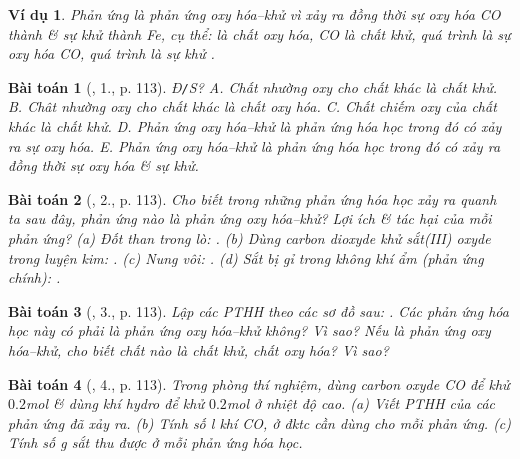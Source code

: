 \documentclass{article}
\newtheorem{baitoan}{Bài toán}
\newtheorem{vidu}{Ví dụ}
\begin{document}
\begin{vidu}
	Phản ứng \emph{} là \emph{phản ứng oxy hóa--khử} vì xảy ra đồng thời sự oxy hóa \emph{CO} thành \emph{} \& sự khử \emph{} thành \emph{Fe}, cụ thể: \emph{} là \emph{chất oxy hóa}, \emph{CO} là \emph{chất khử}, quá trình \emph{} là \emph{sự oxy hóa CO}, quá trình \emph{} là \emph{sự khử }.
\end{vidu}

\begin{baitoan}[\cite{SGK_Hoa_Hoc_8}, 1., p. 113]
	\emph{Đ\texttt{/}S?} {\sf A.} Chất nhường oxy cho chất khác là chất khử. {\sf B.} Chât nhường oxy cho chất khác là chất oxy hóa. {\sf C.} Chất chiếm oxy của chất khác là chất khử. {\sf D.} Phản ứng oxy hóa--khử là phản ứng hóa học trong đó có xảy ra sự oxy hóa. {\sf E.} Phản ứng oxy hóa--khử là phản ứng hóa học trong đó có xảy ra đồng thời sự oxy hóa \& sự khử.
\end{baitoan}

\begin{baitoan}[\cite{SGK_Hoa_Hoc_8}, 2., p. 113]
	Cho biết trong những phản ứng hóa học xảy ra quanh ta sau đây, phản ứng nào là phản ứng oxy hóa--khử? Lợi ích \& tác hại của mỗi phản ứng? (a) Đốt than trong lò: \emph{}. (b) Dùng carbon dioxyde khử sắt(III) oxyde trong luyện kim: \emph{}. (c) Nung vôi: \emph{}. (d) Sắt bị gỉ trong không khí ẩm (phản ứng chính): \emph{}.
\end{baitoan}

\begin{baitoan}[\cite{SGK_Hoa_Hoc_8}, 3., p. 113]
	Lập các PTHH theo các sơ đồ sau: \emph{}. Các phản ứng hóa học này có phải là phản ứng oxy hóa--khử không? Vì sao? Nếu là phản ứng oxy hóa--khử, cho biết chất nào là chất khử, chất oxy hóa? Vì sao?
\end{baitoan}

\begin{baitoan}[\cite{SGK_Hoa_Hoc_8}, 4., p. 113]
	Trong phòng thí nghiệm, dùng carbon oxyde \emph{CO} để khử $0.2$\emph{mol } \& dùng khí hydro để khử $0.2$\emph{mol } ở nhiệt độ cao. (a) Viết PTHH của các phản ứng đã xảy ra. (b) Tính số \emph{l} khí \emph{CO,} ở đktc cần dùng cho mỗi phản ứng. (c) Tính số \emph{g} sắt thu được ở mỗi phản ứng hóa học.
\end{baitoan}
\end{document}
